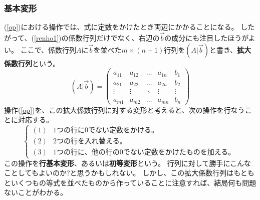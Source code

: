 \documentclass[10pt]{jsreport}
\theoremstyle{definition}%
\newcommand{\kakko}[1]{\left(#1 \right)} %
\numberwithin{equation}{section}%
\begin{document}
\subsubsection{基本変形}
(\ref{op})における操作では、式に定数をかけたとき両辺にかかることになる。
したがって、(\ref{renho1})の係数行列だけでなく、右辺の$\vec{b}$の成分にも注目したほうがよい。
ここで、係数行列$A$に$\vec{b}$を並べた$m\times(n+1)$行列を$(A|\vec{b})$と書き、{\bf 拡大係数行列}という。
\begin{equation}
  (A|\vec{b})=
  \kakko{\begin{array}{cccc|c} 
    a_{11} & a_{12} & \dots  & a_{1n}  & b_{1} \\ 
    a_{21} & a_{22} & \dots  & a_{2n}  & b_{2}\\
    \vdots & \vdots & \ddots & \vdots  & \vdots \\
    a_{m1} & a_{m2} & \dots  & a_{mn} & b_{n}
  \end{array}}
\end{equation}
操作(\ref{op})を、この拡大係数行列に対する変形と考えると、次の操作を行なうことに対応する。
\begin{equation}
  \label{operation}  \begin{cases}
      (1) & \text{1つの行に0でない定数をかける。}\\
      (2) & \text{2つの行を入れ替える。}\\
      (3) & \text{1つの行に、他の行の0でない定数をかけたものを加える。}
    \end{cases}
\end{equation}
この操作を{\bf 行基本変形}、あるいは{\bf 初等変形}という。
行列に対して勝手にこんなことしてもよいのか?と思うかもしれない。
しかし、この拡大係数行列はもともといくつもの等式を並べたものから作っていることに注意すれば、結局何も問題ないことがわかる。
\end{document}
